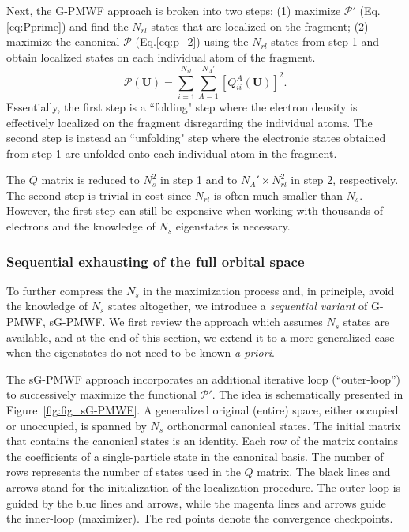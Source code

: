 \documentclass[journal=jacsat,manuscript=article]{achemso}
\begin{document}
Next, the G-PMWF approach is broken into two steps: (1) maximize $\mathcal{P}'$ (Eq.\eqref{eq:Pprime}) and find the $N_{rl}$ states that are localized on the fragment; (2) maximize the canonical $\mathcal{P}$ (Eq.\eqref{eq:p_2}) using the $N_{rl}$ states from step 1 and obtain localized states on each individual atom of the fragment. 
\begin{equation}\label{eq:p_2}
\mathcal{P(\textbf{U})} = \sum_{i=1}^{N_{rl}} \sum_{A=1}^{N_A'} [Q_{ii}^A(\textbf{U})]^2.
\end{equation}
Essentially, the first step is a ``folding" step where the electron density is effectively localized on the fragment disregarding the individual atoms. The second step is instead an ``unfolding" step where the electronic states obtained from step 1 are unfolded onto each individual atom in the fragment.

The $Q$ matrix is reduced to $N_{s}^2$ in step 1 and to $N_A' \times N_{rl}^2$ in step 2, respectively. The second step is trivial in cost since $N_{rl}$ is often much smaller than $N_{s}$. However, the first step can still be expensive when working with thousands of electrons and the knowledge of $N_s$ eigenstates is necessary.

\subsubsection{Sequential exhausting of the full orbital space}
To further compress the $N_{s}$ in the maximization process and, in principle, avoid the knowledge of $N_s$ states altogether, we introduce a \textit{sequential variant} of G-PMWF, sG-PMWF. We first review the approach which assumes $N_s$ states are available, and at the end of this section, we extend it to a more generalized case when the eigenstates do not need to be known \textit{a priori}.

The sG-PMWF approach incorporates an additional iterative loop (``outer-loop'') to successively maximize the functional $\mathcal{P}'$. The idea is schematically presented in Figure~\ref{fig:fig_sG-PMWF}. A generalized original (entire) space, either occupied or unoccupied, is spanned by $N_s$ orthonormal canonical states. The initial matrix that contains the canonical states is an identity. Each row of the matrix contains the coefficients of a single-particle state in the canonical basis. The number of rows represents the number of states used in the $Q$ matrix. The black lines and arrows stand for the initialization of the localization procedure. The outer-loop is guided by the blue lines and arrows, while the magenta lines and arrows guide the inner-loop (maximizer). The red points denote the convergence checkpoints.
\end{document}
